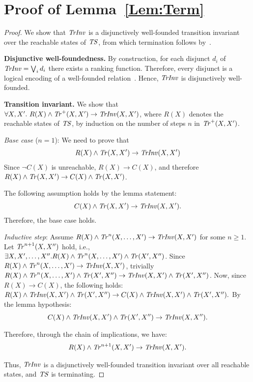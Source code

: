 \setcounter{section}{0}
\renewcommand{\thesection}{\Alph{section}}%
\section{Proof of Lemma~\ref{Lem:Term}} \label{App:proofs}


\begin{proof}
    We show that $\mathit{TrInv}$ is a disjunctively well-founded transition 
    invariant over the reachable states of $\mathit{TS}$, from which 
    termination follows by~\cite{DBLP:conf/lics/PodelskiR04}.

    \textbf{Disjunctive well-foundedness.} By construction, for each disjunct 
    $d_i$ of $\mathit{TrInv} = \bigvee_i d_i$ there exists a ranking function.
    Therefore, every disjunct is a logical encoding of a
    well-founded relation~\cite{DBLP:conf/vmcai/PodelskiR04}.
    Hence, $\mathit{TrInv}$ is disjunctively well-founded.

    \textbf{Transition invariant.} We show that 
    $\forall X,X'.\ R(X) \land \mathit{Tr}^+(X,X') \rightarrow \mathit{TrInv}(X,X')$,
    where $R(X)$ denotes the reachable states of $\mathit{TS}$, by induction 
    on the number of steps $n$ in $\mathit{Tr}^+(X,X')$.

    \emph{Base case} ($n = 1$): We need to prove that
    $$R(X) \land \mathit{Tr}(X,X') \rightarrow \mathit{TrInv}(X,X')$$ 
    Since $\lnot C(X)$ is unreachable, $R(X) \rightarrow C(X)$,
    and therefore $R(X) \land \mathit{Tr}(X,X') \rightarrow C(X) \land \mathit{Tr}(X,X')$. 

    The following assumption holds by the lemma statement:
    $$C(X) \land \mathit{Tr}(X,X') \rightarrow \mathit{TrInv}(X,X').$$
    Therefore, the base case holds.

    \emph{Inductive step}: Assume $R(X) \land \mathit{Tr}^n(X, \ldots,X') \rightarrow 
    \mathit{TrInv}(X,X')$ for some $n \geq 1$. 
    Let $\mathit{Tr}^{n+1}(X,X'')$ hold, i.e., $\exists X, X', \ldots, X''. R(X) \land \mathit{Tr}^n(X,\ldots,X') \land \mathit{Tr}(X', X'')$.
    Since $R(X) \land \mathit{Tr}^n(X, \ldots, X') \rightarrow \mathit{TrInv}(X,X')$, trivially
    $R(X) \land \mathit{Tr}^n(X,\ldots,X') \land \mathit{Tr}(X', X'') \rightarrow \mathit{TrInv}(X,X') \land \mathit{Tr}(X',X'')$.
    Now, since $R(X) \rightarrow C(X)$, the following holds:
    $R(X) \land \mathit{TrInv}(X,X') \land \mathit{Tr}(X', X'') \rightarrow C(X) \land \mathit{TrInv}(X,X') \land \mathit{Tr}(X', X'') .$
    By the lemma hypothesis:
    $$C(X) \land \mathit{TrInv}(X,X') \land \mathit{Tr}(X',X'') \rightarrow \mathit{TrInv}(X,X'').$$

    Therefore, through the chain of implications, we have:
    $$R(X) \land \mathit{Tr}^{n+1}(X,X') \rightarrow \mathit{TrInv}(X,X').$$

    Thus, $\mathit{TrInv}$ is a disjunctively well-founded transition 
    invariant over all reachable states, and $\mathit{TS}$ is 
    terminating.
\end{proof}


